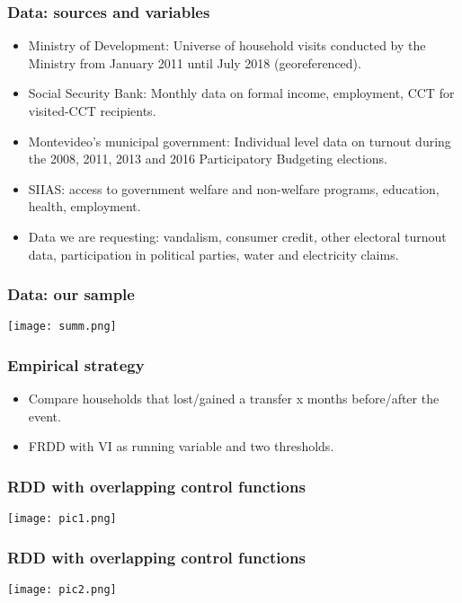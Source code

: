 \documentclass{beamer}
\begin{document}
\begin{frame}
\frametitle{Data: sources and variables}
\begin{itemize}
	\item Ministry of Development: Universe of household visits conducted by the Ministry from January 2011 until July 2018 {\color{gray}(georeferenced)}.
	\item Social Security Bank: Monthly data on formal income, employment, CCT for visited-CCT recipients.
	\item Montevideo's municipal government: Individual level data on turnout during the 2008, 2011, 2013 and 2016 Participatory Budgeting elections.	
	\item {\color{gray}SIIAS: access to government welfare and non-welfare programs, education, health, employment.}
	\item {\color{gray}Data we are requesting: vandalism, consumer credit, other electoral turnout data, participation in political parties, water and electricity claims.}
\end{itemize}
\end{frame}

\begin{frame}
\frametitle{Data: our sample}
\begin{center}
\texttt{[image: summ.png]}
\label{summ}
\end{center}
\end{frame}


\begin{frame}
\frametitle{Empirical strategy}
\begin{itemize}
	\item Compare households that lost/gained a transfer x months before/after the event. 
	\item FRDD with VI as running variable and two thresholds.
\end{itemize}
\end{frame}


\begin{frame}
\frametitle{RDD with overlapping control functions}
\begin{center}
\texttt{[image: pic1.png]}
\label{pic1}
\end{center}
\end{frame}


\begin{frame}
\frametitle{RDD with overlapping control functions}
\begin{center}
\texttt{[image: pic2.png]}
\label{pic2}
\end{center}
\end{frame}
\end{document}
